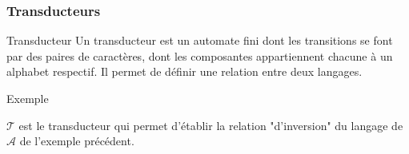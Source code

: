 \documentclass{beamer}
\begin{document}
\begin{frame}
\frametitle{Transducteurs}
\begin{block}{Transducteur}
Un transducteur est un automate fini dont les transitions se font par des paires de caractères, dont les composantes appartiennent chacune à un alphabet respectif. Il permet de définir une relation entre deux langages.
\end{block}
\begin{exampleblock}{Exemple}
\begin{figure}[H]
\centering
{}
\end{figure}
$\mathcal{T}$ est le transducteur qui permet d'établir la relation "d'inversion" du langage de $\mathcal{A}$ de l'exemple précédent.
\end{exampleblock}
\end{frame}
\end{document}
